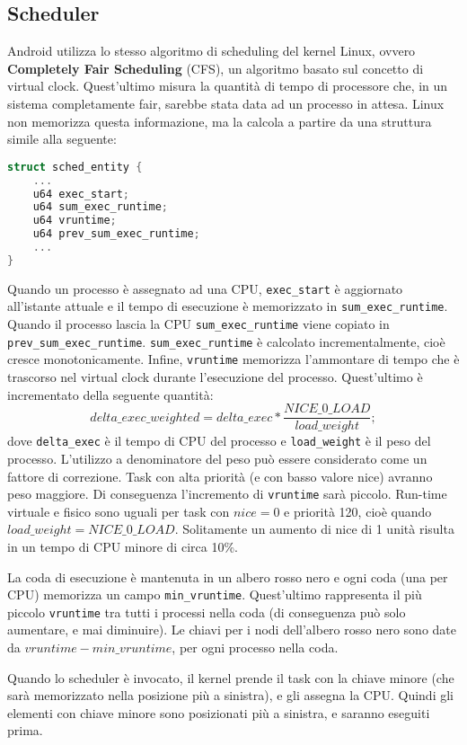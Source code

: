 \subsection{Scheduler}
Android utilizza lo stesso algoritmo di scheduling del kernel Linux, ovvero \textbf{Completely Fair Scheduling} (CFS), un algoritmo basato sul concetto di virtual clock. Quest'ultimo misura la quantità di tempo di processore che, in un sistema completamente fair, sarebbe stata data ad un processo in attesa. Linux non memorizza questa informazione, ma la calcola a partire da una struttura simile alla seguente:
\begin{lstlisting}[language=c, caption={Entità schedulabile in Linux}, label={lst:schedentity}]
struct sched_entity {
	...
	u64 exec_start;
	u64 sum_exec_runtime;
	u64 vruntime;
	u64 prev_sum_exec_runtime;
	...
}
\end{lstlisting}
Quando un processo è assegnato ad una CPU, \texttt{exec\_start} è aggiornato all'istante attuale e il tempo di esecuzione è memorizzato in \texttt{sum\_exec\_runtime}. Quando il processo lascia la CPU \texttt{sum\_exec\_runtime} viene copiato in \texttt{prev\_sum\_exec\_runtime}. \texttt{sum\_exec\_runtime} è calcolato incrementalmente, cioè cresce monotonicamente. Infine, \texttt{vruntime} memorizza l'ammontare di tempo che è trascorso nel virtual clock durante l'esecuzione del processo. Quest'ultimo è incrementato della seguente quantità:
\[ delta\_exec\_weighted = delta\_exec * \frac{NICE\_0\_LOAD}{load\_weight}; \]
dove \texttt{delta\_exec} è il tempo di CPU del processo e \texttt{load\_weight} è il peso del processo. L'utilizzo a denominatore del peso può essere considerato come un fattore di correzione. Task con alta priorità (e con basso valore nice) avranno peso maggiore. Di conseguenza l'incremento di \texttt{vruntime} sarà piccolo. Run-time virtuale e fisico sono uguali per task con $nice = 0$ e priorità 120, cioè quando $load\_weight = NICE\_0\_LOAD$. Solitamente un aumento di nice di 1 unità risulta in un tempo di CPU minore di circa 10\%. 

La coda di esecuzione è mantenuta in un albero rosso nero e ogni coda (una per CPU) memorizza un campo \texttt{min\_vruntime}. Quest'ultimo rappresenta il più piccolo \texttt{vruntime} tra tutti i processi nella coda (di conseguenza può solo aumentare, e mai diminuire). Le chiavi per i nodi dell'albero rosso nero sono date da $vruntime - min\_vruntime$, per ogni processo nella coda.

Quando lo scheduler è invocato, il kernel prende il task con la chiave minore (che sarà memorizzato nella posizione più a sinistra), e gli assegna la CPU. Quindi gli elementi con chiave minore sono posizionati più a sinistra, e saranno eseguiti prima.

